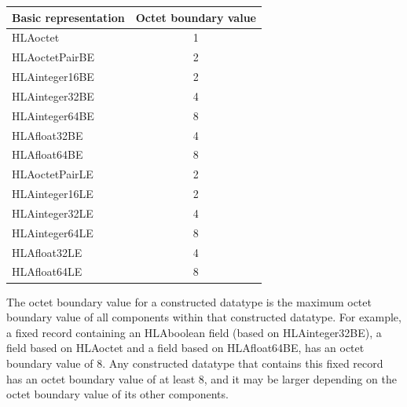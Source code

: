 \begin{center}
    \begingroup
    \fontsize{8.2}{9.4}\selectfont
    \setlength{\tabcolsep}{11pt}
    \renewcommand{\arraystretch}{1.55}
    \begin{tabular}{|l|c|}
        \hline
        \bfseries Basic representation & \bfseries Octet boundary value \\
        \hline
        HLAoctet                       & 1                              \\
        HLAoctetPairBE                 & 2                              \\
        HLAinteger16BE                 & 2                              \\
        HLAinteger32BE                 & 4                              \\
        HLAinteger64BE                 & 8                              \\
        HLAfloat32BE                   & 4                              \\
        HLAfloat64BE                   & 8                              \\
        HLAoctetPairLE                 & 2                              \\
        HLAinteger16LE                 & 2                              \\
        HLAinteger32LE                 & 4                              \\
        HLAinteger64LE                 & 8                              \\
        HLAfloat32LE                   & 4                              \\
        HLAfloat64LE                   & 8                              \\
        \hline
    \end{tabular}
    \endgroup
\end{center}

The octet boundary value for a constructed datatype is the maximum octet boundary value of all components within that constructed datatype. For example, a fixed record containing an HLAboolean field (based on HLAinteger32BE), a field based on HLAoctet and a field based on HLAfloat64BE, has an octet boundary value of 8. Any constructed datatype that contains this fixed record has an octet boundary value of at least 8, and it may be larger depending on the octet boundary value of its other components.

